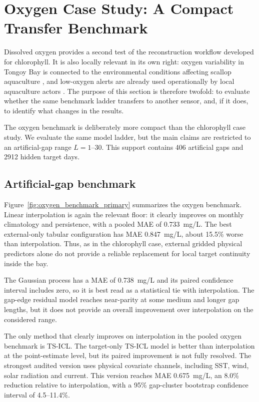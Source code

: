 \section{Oxygen Case Study: A Compact Transfer Benchmark}
\label{sec:oxygen}

Dissolved oxygen provides a second test of the reconstruction workflow developed for
chlorophyll. It is also locally relevant in its own right: oxygen variability in Tongoy Bay is
connected to the environmental conditions affecting scallop aquaculture
\citep{ramajo2019scallops}, and low-oxygen alerts are already used operationally by local
aquaculture actors \citep{ceaza_tongoy_oxygen_alerts_2024}. The purpose of this section is
therefore twofold: to evaluate whether the same benchmark ladder transfers to another sensor, and,
if it does, to identify what changes in the results.

The oxygen benchmark is deliberately more compact than the
chlorophyll case study. We evaluate the same model ladder, but the main claims
are restricted to an artificial-gap range $L=1$--30. This support contains
406 artificial gaps and 2912 hidden target days.

\subsection{Artificial-gap benchmark}
\label{sec:oxygen_benchmark}

Figure~\ref{fig:oxygen_benchmark_primary} summarizes the oxygen benchmark. Linear
interpolation is again the relevant floor: it clearly improves on monthly climatology and
persistence, with a pooled MAE of 0.733~mg/L. The best external-only
tabular configuration has MAE 0.847~mg/L, about 15.5\% worse than interpolation. Thus, as in the
chlorophyll case, external gridded physical predictors alone do not provide a reliable replacement
for local target continuity inside the bay.

The Gaussian process has a MAE of 0.738~mg/L and its
paired confidence interval includes zero, so it is best read as a statistical tie with
interpolation. The gap-edge residual model reaches near-parity at some medium and longer
gap lengths, but it does not provide an overall improvement over interpolation on the considered
range.

The only method that clearly improves on interpolation in the pooled oxygen benchmark is TS-ICL.
The target-only TS-ICL model is better than interpolation at the point-estimate level, but its
paired improvement is not fully resolved. The strongest audited version uses physical covariate
channels, including SST, wind, solar radiation and
current. This version reaches MAE 0.675~mg/L, an 8.0\% reduction relative to
interpolation, with a 95\% gap-cluster bootstrap confidence interval of 4.5--11.4\%.

